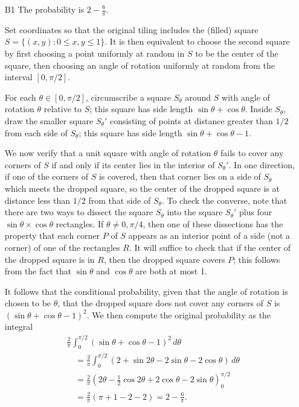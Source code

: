 \documentclass[amssymb,twocolumn,pra,10pt,aps]{revtex4-1}
\begin{document}
\begin{itemize}
\item[B1]
The probability is $2 - \frac{6}{\pi}$.

Set coordinates so that the original tiling includes the (filled) square 
$S = \{(x,y): 0 \leq x,y \leq 1 \}$. It is then equivalent to choose the second square by first choosing a point uniformly at random in $S$ to be the center of the square, then choosing an angle of rotation uniformly at random from the interval $[0, \pi/2]$.

For each $\theta \in [0, \pi/2]$, circumscribe a square $S_\theta$ around $S$ with angle of rotation $\theta$ relative to $S$; this square has side length $\sin \theta + \cos \theta$. Inside $S_\theta$, draw the smaller square $S_\theta'$ consisting of points at distance greater than $1/2$ from each side of $S_\theta$; this square has side length $\sin \theta + \cos \theta - 1$. 

We now verify that a unit square with angle of rotation $\theta$ fails to cover any corners of $S$ if and only if its center lies in the interior of $S_\theta'$. In one direction, if one of the corners of $S$ is covered, then that corner lies on a side of $S_\theta$ which meets the dropped square, so the center of the dropped square is at distance less than $1/2$ from that side of $S_\theta$.
To check the converse, note that
there are two ways to dissect the square $S_\theta$ into the square $S_\theta'$ plus four $\sin \theta \times \cos \theta$ rectangles. If $\theta \neq 0, \pi/4$, then one of these dissections
has the property that each corner $P$ of $S$ appears as an interior point of a side (not a corner) of one of the rectangles $R$. 
It will suffice to check that if the center of the dropped square is in $R$, then the dropped square covers $P$; this follows from the fact that $\sin \theta$ and $\cos \theta$ are both at most 1.

It follows that the conditional probability, given that the angle of rotation is chosen to be $\theta$, that the dropped square does not cover any corners of $S$ is $(\sin \theta + \cos \theta - 1)^2$. We then compute the original probability as the integral
\begin{align*}
&\frac{2}{\pi} \int_0^{\pi/2} (\sin \theta + \cos \theta - 1)^2\,d\theta \\
&\quad =
\frac{2}{\pi} \int_0^{\pi/2} (2 + \sin 2\theta - 2\sin \theta - 2 \cos \theta)\,d\theta\\
&\quad = \frac{2}{\pi} \left( 2 \theta - \frac{1}{2} \cos 2\theta + 2 \cos \theta - 2 \sin \theta \right)_0^{\pi/2} \\
&\quad = \frac{2}{\pi} \left( \pi + 1 - 2 - 2 \right) = 2 - \frac{6}{\pi}.
\end{align*}


\end{itemize}
\end{document}
